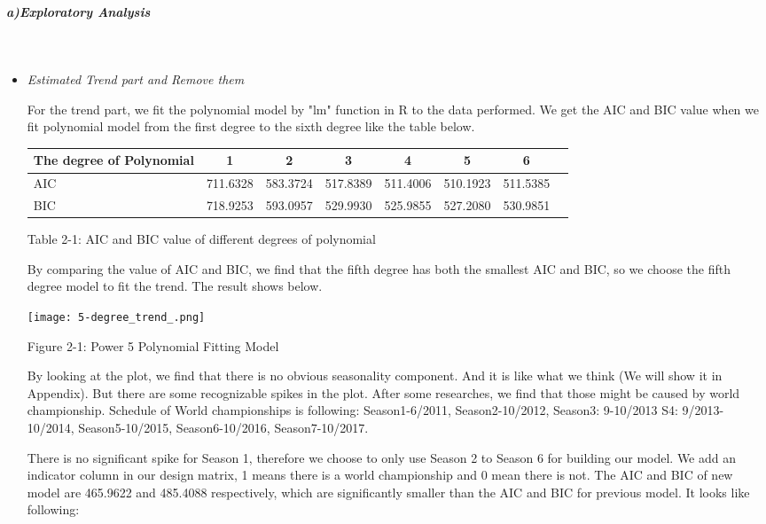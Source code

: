 \documentclass[11pt,a4paper]{article}
\begin{document}
\subparagraph{a)Exploratory Analysis}\mbox{}\\ 
\begin{itemize}\item

\textit{Estimated Trend part and Remove them}

For the trend part, we fit the polynomial model by "lm" function in R to the data performed. We get the AIC and BIC value when we fit polynomial model from the first degree to the sixth degree like the table below.
{
\begin{table}[htbp]
\centering
\begin{tabular}{l  c  c  c  c  c  c  c }\hline\hline
\multicolumn{1}{c}{The degree of Polynomial} & 1& 2&3& 4&5&6\\ \hline
AIC&711.6328 &583.3724& 517.8389 &511.4006 &510.1923 &511.5385\\
BIC&718.9253& 593.0957&529.9930 &525.9855& 527.2080 &530.9851\\
\hline \hline
 \end{tabular}
\end{table}
}
 \begin{center}
 {Table 2-1: AIC and BIC value of different degrees of polynomial}
 \end{center}
 

By comparing the value of AIC and BIC, we find that the fifth degree has both the smallest AIC and BIC, so we choose the fifth degree model to fit the trend. The result shows below.

\begin{center}
\texttt{[image: 5-degree\_trend\_.png]}

{Figure 2-1: Power 5 Polynomial Fitting Model}
\end{center}

By looking at the plot, we find that there is no obvious seasonality component. And it is like what we think (We will show it in Appendix). But there are some recognizable spikes in the plot. After some researches, we find that those might be caused by world championship. Schedule of World championships is following: Season1-6/2011, Season2-10/2012, Season3: 9-10/2013 S4: 9/2013-10/2014, Season5-10/2015,  Season6-10/2016, Season7-10/2017.\newline

There is no significant spike for Season  1, therefore we choose to only use Season 2 to Season 6 for building our model.
We add an indicator column in our design matrix, 1 means there is a world championship and 0 mean there is not. The AIC and BIC of new model are 465.9622 and 485.4088 respectively, which are significantly smaller than the AIC and BIC for previous model. It looks like following:	


\end{itemize}
\end{document}
